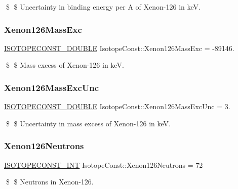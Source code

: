 \$ \$ Uncertainty in binding energy per A of Xenon-\/126 in keV. \mbox{\label{group___isotope_const-_xenon-_xe126_ga6f0290e27deeb5daccd25c4c645c9cb7}} 
\subsubsection{\texorpdfstring{Xenon126\+Mass\+Exc}{Xenon126MassExc}}
{\footnotesize\ttfamily \mbox{\hyperlink{group___isotope_const-_macros_ga8f45a7272ce02c0b4c65c44636ed719a}{I\+S\+O\+T\+O\+P\+E\+C\+O\+N\+S\+T\+\_\+\+D\+O\+U\+B\+LE}} Isotope\+Const\+::\+Xenon126\+Mass\+Exc = -\/89146.}

\$ \$ Mass excess of Xenon-\/126 in keV. \mbox{\label{group___isotope_const-_xenon-_xe126_gae6496a22e8953ddcc8a16f4ada96e496}} 
\subsubsection{\texorpdfstring{Xenon126\+Mass\+Exc\+Unc}{Xenon126MassExcUnc}}
{\footnotesize\ttfamily \mbox{\hyperlink{group___isotope_const-_macros_ga8f45a7272ce02c0b4c65c44636ed719a}{I\+S\+O\+T\+O\+P\+E\+C\+O\+N\+S\+T\+\_\+\+D\+O\+U\+B\+LE}} Isotope\+Const\+::\+Xenon126\+Mass\+Exc\+Unc = 3.}

\$ \$ Uncertainty in mass excess of Xenon-\/126 in keV. \mbox{\label{group___isotope_const-_xenon-_xe126_ga4866f98ed4c4b088f3a0fa77c71f2a95}} 
\subsubsection{\texorpdfstring{Xenon126\+Neutrons}{Xenon126Neutrons}}
{\footnotesize\ttfamily \mbox{\hyperlink{group___isotope_const-_macros_ga5f18360b3e99483a35c32d789e62621c}{I\+S\+O\+T\+O\+P\+E\+C\+O\+N\+S\+T\+\_\+\+I\+NT}} Isotope\+Const\+::\+Xenon126\+Neutrons = 72}

\$ \$ Neutrons in Xenon-\/126. \mbox{\label{group___isotope_const-_xenon-_xe126_gabc512216181d153105a1dda0ab1ce005}} 
